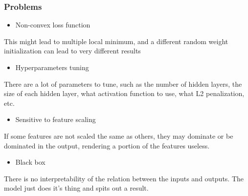 \subsubsection{Problems}
\begin{itemize}
\item Non-convex loss function
\end{itemize}
This might lead to multiple local minimum, and a different random weight initialization can lead to very different results

\begin{itemize}
\item Hyperparameters tuning
\end{itemize}
There are a lot of parameters to tune, such as the number of hidden layers, the size of each hidden layer, what activation function to use, what L2 penalization, etc.
\begin{itemize}
\item Sensitive to feature scaling
\end{itemize}
If some features are not scaled the same as others, they may dominate or be dominated in the output, rendering a portion of the features useless.
\begin{itemize}
\item Black box
\end{itemize}
There is no interpretability of the relation between the inputs and outputs. The model just does it's thing and spits out a result.